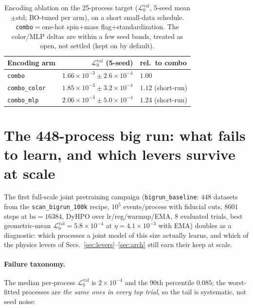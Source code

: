 \documentclass[11pt]{article}
\newcommand{\vlnr}{\mathcal{L}^{\mathrm{val}}_{0}}   %
\newcommand{\code}[1]{\texttt{#1}}
\begin{document}
\begin{table}[H]
\centering
\caption{Encoding ablation on the 25-process target ($\vlnr$, 5-seed mean$\pm$std; BO-tuned per
arm), on a short small-data schedule. \code{combo}$=$one-hot spin$+$mass flag$+$standardization.
The color/MLP deltas are within a few seed bands, treated as open, not settled (kept on by
default).}
\label{tab:enc}
\begin{tabular}{@{}lrl@{}}
\toprule
Encoding arm & $\vlnr$ (5-seed) & rel.\ to combo \\
\midrule
\code{combo}        & $1.66\times10^{-3}\pm2.6\times10^{-4}$ & $1.00$ \\
\code{combo\_color} & $1.85\times10^{-3}\pm3.2\times10^{-4}$ & $1.12$ (short-run) \\
\code{combo\_mlp}   & $2.06\times10^{-3}\pm5.0\times10^{-4}$ & $1.24$ (short-run) \\
\bottomrule
\end{tabular}
\end{table}

\section{The 448-process big run: what fails to learn, and which levers survive at scale}\label{sec:bigrun}

The first full-scale joint pretraining campaign (\code{bigrun\_baseline}: $448$ datasets from the
\code{scan\_bigrun\_100k} recipe, $10^5$ events/process with fiducial cuts, $8601$ steps at
$\mathrm{bs}=16384$, DyHPO over lr/reg/warmup/EMA, $8$ evaluated trials, best geometric-mean
$\vlnr=5.8\times10^{-4}$ at $\eta=4.1\times10^{-3}$ with EMA) doubles as a diagnostic: which
processes a joint model of this size actually learns, and which of the physics levers of
Secs.~\ref{sec:levers}--\ref{sec:arch} still earn their keep at scale.

\paragraph{Failure taxonomy.} The median per-process $\vlnr$ is $2\times10^{-4}$ and the $90$th
percentile $0.085$; the worst-fitted processes are \emph{the same ones in every top trial}, so the
tail is systematic, not seed noise:
\end{document}
